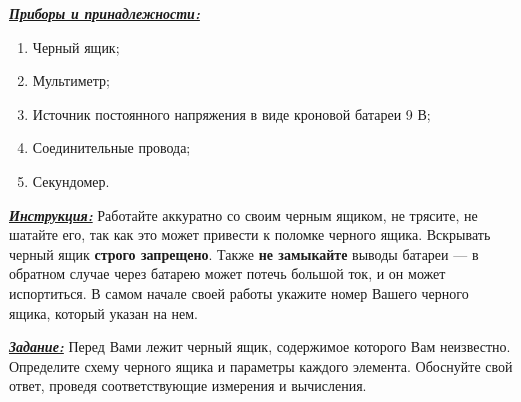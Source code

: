 
\textbf{\uline{\textit{Приборы и принадлежности:}}}

\vspace*{6pt}

\begin{enumerate}[label=\textbf{\arabic*.}]
    \item Черный ящик;
    \item Мультиметр;
    \item Источник постоянного напряжения в виде кроновой батареи 9 В;
    \item Соединительные провода;
    \item Секундомер.
\end{enumerate}

\vspace{10pt}

\textbf{\uline{\textit{Инструкция:}}} Работайте аккуратно со своим черным ящиком, не трясите, не шатайте его, так как это может привести к поломке черного ящика. Вскрывать черный ящик \textbf{строго запрещено}. Также \textbf{не замыкайте} выводы батареи --- в обратном случае через батарею может потечь большой ток, и он может испортиться. В самом начале своей работы укажите номер Вашего черного ящика, который указан на нем.

\vspace{10pt}

\textbf{\uline{\textit{Задание:}}} Перед Вами лежит черный ящик, содержимое которого Вам неизвестно. Определите схему черного ящика и параметры каждого элемента. Обоснуйте свой ответ, проведя соответствующие измерения и вычисления.
